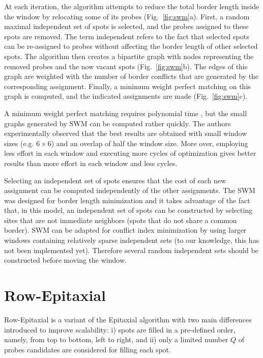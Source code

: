 At each iteration, the algorithm attempts to reduce the total border length
inside the window by relocating some of its probes (Fig.~\ref{fig:swm}a). First,
a random maximal independent set of spots is selected, and the probes assigned
to these spots are removed. The term independent refers to the fact that
selected spots can be re-assigned to probes without affecting the border length
of other selected spots. The algorithm then creates a bipartite graph with nodes
representing the removed probes and the now vacant spots (Fig.~\ref{fig:swm}b).
The edges of this graph are weighted with the number of border conflicts that
are generated by the corresponding assignment.  Finally, a minimum weight
perfect matching on this graph is computed, and the indicated assignments are
made (Fig.~\ref{fig:swm}c).

A minimum weight perfect matching requires polynomial time \citep{Gross2004},
but the small graphs generated by SWM can be computed rather quickly. The
authors experimentally observed that the best results are obtained with small
window sizes (e.g. $6\times 6$) and an overlap of half the window size. More
over, employing less effort in each window and executing more cycles of
optimization gives better results than more effort in each window and less
cycles.

Selecting an independent set of spots ensures that the cost of each new
assignment can be computed independently of the other assignments. The SWM was
designed for border length minimization and it takes advantage of the fact that,
in this model, an independent set of spots can be constructed by selecting sites
that are not immediate neighbors (spots that do not share a common border). SWM
can be adapted for conflict index minimization by using larger windows
containing relatively sparse independent sets (to our knowledge, this has not
been implemented yet). Therefore several random independent sets should be
constructed before moving the window.

\section{Row-Epitaxial}
\label{sec:placement_reptx}

Row-Epitaxial \citep{Kahng2003} is a variant of the Epitaxial algorithm with two
main differences introduced to improve scalability: i) spots are filled in a
pre-defined order, namely, from top to bottom, left to right, and ii) only a
limited number $Q$ of probes candidates are considered for filling each spot.

